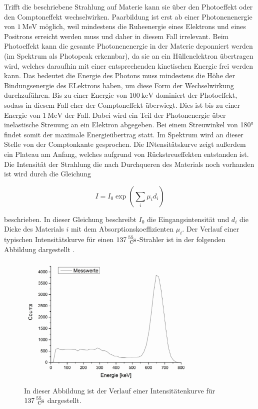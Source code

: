 Trifft die beschriebene Strahlung auf Materie kann sie über den Photoeffekt oder den 
Comptoneffekt wechselwirken. Paarbildung ist erst ab einer Photonenenergie von 
$\SI{1}{\mega\eV}$ möglich, weil mindestens die Ruheenergie eines Elektrons und eines 
Positrons erreicht werden muss und daher in diesem Fall irrelevant.
Beim Photoeffekt kann die gesamte Photonenenergie in der Materie deponniert werden
(im Spektrum als Photopeak erkennbar), 
da sie an ein Hüllenelektron übertragen wird, welches daraufhin mit einer 
entsprechenden kinetischen Energie frei werden kann. Das bedeutet die Energie des Photons 
muss mindestens die Höhe der Bindungsenergie des ELektrons haben, um diese Form der 
Wechselwirkung durchzuführen. Bis zu einer Energie von $\SI{100}{\kilo\eV}$ dominiert 
der Photoeffekt, sodass in diesem Fall eher der Comptoneffekt überwiegt.
Dies ist bis zu einer Energie von $\SI{1}{\mega\eV}$ der Fall. Dabei wird ein Teil der 
Photonenergie über inelastische Streuung an ein Elektron abgegeben. Bei einem 
Streuwinkel von 180° findet somit der maximale Energieübertrag statt. Im Spektrum wird an 
dieser Stelle von der Comptonkante gesprochen. 
Die INtensitätskurve zeigt außerdem ein Plateau am Anfang, welches aufgrund von 
Rückstreueffekten entstanden ist. Die Intensität der Strahlung die 
nach Durchqueren des Materials noch vorhanden ist wird durch die Gleichung 

\begin{equation}
	I = I_0 \exp( \sum_i \mu_i d_i )
	\label{eq1}
\end{equation}

beschrieben. In dieser Gleichung beschreibt $I_0$ die Eingangsintensität und $d_i$ die 
Dicke des Materials $i$ mit dem Absorptionskoeffizienten $\mu_{i}$. Der 
Verlauf einer typischen Intensitätskurve für einen 
$\ce{137^55_Cs}$-Strahler ist in der folgenden Abbildung dargestellt \cite{Kerne}.

\begin{figure}
	\centering
	\includegraphics[width=0.8\textwidth]{figure/Kurve.pdf}
	\caption{In dieser Abbildung ist der Verlauf einer Intensitätenkurve für 
	$\ce{137^55_Cs}$ dargestellt.}
	\label{abbkurve}
\end{figure}

